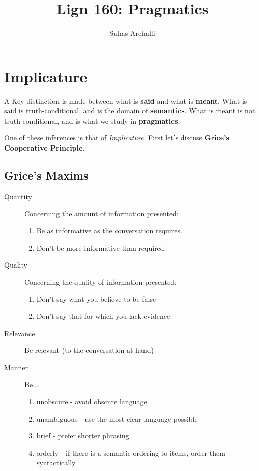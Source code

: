 \documentclass[11pt]{article}
\title{Lign 160: Pragmatics}
\author{Suhas Arehalli}
\begin{document}
\maketitle

\section{Implicature}
A Key distinction is made between what is \textbf{said} and what is \textbf{meant}. What is said is 
truth-conditional, and is the domain of \textbf{semantics}. What is meant is not truth-conditional,
and is what we study in \textbf{pragmatics}. 

One of these inferences is that of \textit{Implicature}. First let's discuss \textbf{Grice's Cooperative 
Principle}. 
\subsection{Grice's Maxims}
\begin{description}
    \item[Quantity] Concerning the amount of information presented: 
        \begin{enumerate}
            \item Be as informative as the conversation requires. 
            \item Don't be more informative than required.
        \end{enumerate}
    \item[Quality] Concerning the quality of information presented:
        \begin{enumerate}
            \item Don't say what you believe to be false
            \item Don't say that for which you lack evidence
        \end{enumerate}
    \item[Relevance] Be relevant (to the conversation at hand)
    \item[Manner] Be...
        \begin{enumerate}
            \item unobscure - avoid obscure language
            \item unambiguous - use the most clear language possible
            \item brief - prefer shorter phrasing
            \item orderly - if there is a semantic ordering to items, order them syntactically
        \end{enumerate}
\end{description}
\end{document}
